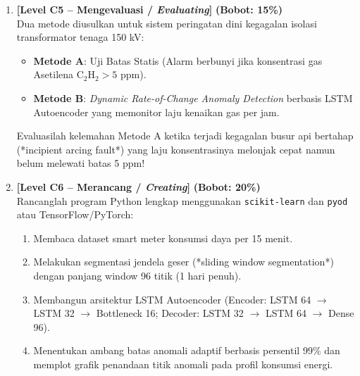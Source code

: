 \documentclass[11pt,a4paper]{article}
\begin{document}
\begin{enumerate}[leftmargin=1.5em, label=\textbf{Soal \arabic*.}]
    \vspace{0.4cm}

    \item \textbf{[Level C5 -- Mengevaluasi / \textit{Evaluating}]} \hfill \textbf{(Bobot: 15\%)} \\
    Dua metode diusulkan untuk sistem peringatan dini kegagalan isolasi transformator tenaga 150 kV:
    \begin{itemize}
        \item \textbf{Metode A}: Uji Batas Statis (Alarm berbunyi jika konsentrasi gas Asetilena C$_2$H$_2 > 5$ ppm).
        \item \textbf{Metode B}: \textit{Dynamic Rate-of-Change Anomaly Detection} berbasis LSTM Autoencoder yang memonitor laju kenaikan gas per jam.
    \end{itemize}
    Evaluasilah kelemahan Metode A ketika terjadi kegagalan busur api bertahap (*incipient arcing fault*) yang laju konsentrasinya melonjak cepat namun belum melewati batas 5 ppm!

    \vspace{0.4cm}

    \item \textbf{[Level C6 -- Merancang / \textit{Creating}]} \hfill \textbf{(Bobot: 20\%)} \\
    Rancanglah program Python lengkap menggunakan \texttt{scikit-learn} dan \texttt{pyod} atau TensorFlow/PyTorch:
    \begin{enumerate}[label=\alph*.]
        \item Membaca dataset smart meter konsumsi daya per 15 menit.
        \item Melakukan segmentasi jendela geser (*sliding window segmentation*) dengan panjang window 96 titik (1 hari penuh).
        \item Membangun arsitektur LSTM Autoencoder (Encoder: LSTM 64 $\to$ LSTM 32 $\to$ Bottleneck 16; Decoder: LSTM 32 $\to$ LSTM 64 $\to$ Dense 96).
        \item Menentukan ambang batas anomali adaptif berbasis persentil 99\% dan memplot grafik penandaan titik anomali pada profil konsumsi energi.
    \end{enumerate}

\end{enumerate}
\end{document}
